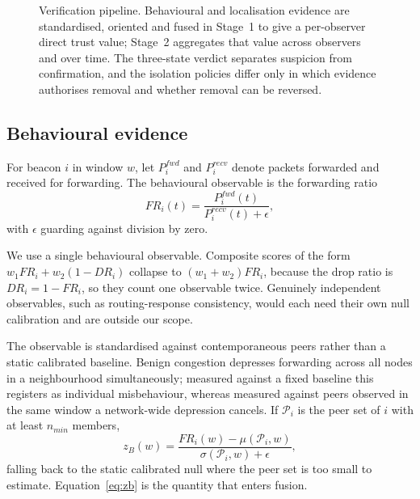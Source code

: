 \begin{figure}[!t]
{}
\caption{Verification pipeline. Behavioural and localisation evidence are
standardised, oriented and fused in Stage~1 to give a per-observer direct
trust value; Stage~2 aggregates that value across observers and over time.
The three-state verdict separates suspicion from confirmation, and the
isolation policies differ only in which evidence authorises removal and
whether removal can be reversed.}
\label{fig:pipeline}
\end{figure}

\subsection{Behavioural evidence}

For beacon $i$ in window $w$, let $P_i^{fwd}$ and $P_i^{recv}$ denote packets
forwarded and received for forwarding. The behavioural observable is the
forwarding ratio
\begin{equation}
\label{eq:fr}
FR_i(t) = \frac{P_i^{fwd}(t)}{P_i^{recv}(t) + \epsilon},
\end{equation}
with $\epsilon$ guarding against division by zero.

We use a single behavioural observable. Composite scores of the form
$w_1 FR_i + w_2(1-DR_i)$ collapse to $(w_1 + w_2) FR_i$, because the drop ratio
is $DR_i = 1 - FR_i$, so they count one observable twice. Genuinely independent
observables, such as routing-response consistency, would each need their own
null calibration and are outside our scope.

The observable is standardised against contemporaneous peers rather than a
static calibrated baseline. Benign congestion depresses forwarding across all
nodes in a neighbourhood simultaneously; measured against a fixed baseline
this registers as individual misbehaviour, whereas measured against peers
observed in the same window a network-wide depression cancels. If
$\mathcal{P}_i$ is the peer set of $i$ with at least $n_{min}$ members,
\begin{equation}
\label{eq:zb}
z_B(w) = \frac{FR_i(w) - \mu(\mathcal{P}_i, w)}{\sigma(\mathcal{P}_i, w) + \epsilon},
\end{equation}
falling back to the static calibrated null where the peer set is too small to
estimate. Equation~\eqref{eq:zb} is the quantity that enters fusion.

